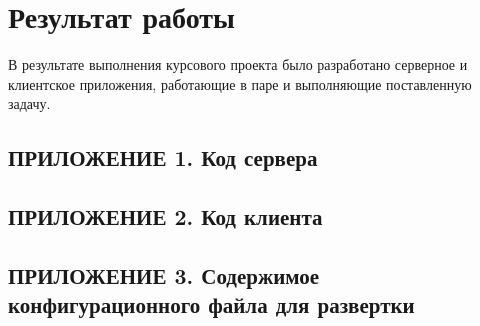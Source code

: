 \documentclass[a4paper, 12pt]{article}
\begin{document}
    \section*{Результат работы}
        В результате выполнения курсового проекта было разработано серверное и клиентское приложения,
        работающие в паре и выполняющие поставленную задачу.

    \newpage
    \subsection*{ПРИЛОЖЕНИЕ 1. Код сервера}
    

    \newpage
    \subsection*{ПРИЛОЖЕНИЕ 2. Код клиента}
    

    \newpage
    \subsection*{ПРИЛОЖЕНИЕ 3. Содержимое конфигурационного файла для развертки}
    
\end{document}
